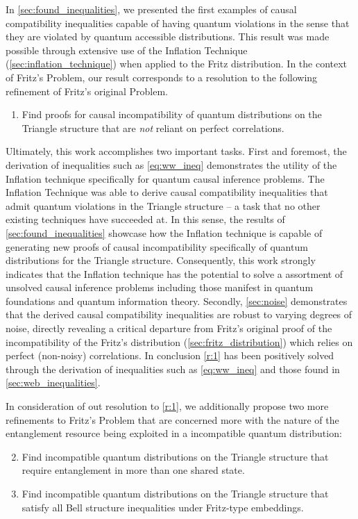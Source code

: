 \documentclass[aps, 10pt, english, twoside, pra, nofootinbib, tightenlines, longbibliography, superscriptaddress]{revtex4-1}
\begin{document}
    In \cref{sec:found_inequalities}, we presented the first examples of causal compatibility inequalities capable of having quantum violations in the sense that they are violated by quantum accessible distributions. This result was made possible through extensive use of the Inflation Technique (\cref{sec:inflation_technique}) when applied to the Fritz distribution. In the context of Fritz's Problem, our result corresponds to a resolution to the following refinement of Fritz's original Problem.
    \begin{enumerate}[label=\textbf{R.\arabic*}]
        \setcounter{enumi}{0}
        \item \label{r:1} Find proofs for causal incompatibility of quantum distributions on the Triangle structure that are \textit{not} reliant on perfect correlations.
    \end{enumerate}

    Ultimately, this work accomplishes two important tasks. First and foremost, the derivation of inequalities such as \cref{eq:ww_ineq} demonstrates the utility of the Inflation technique specifically for quantum causal inference problems. The Inflation Technique was able to derive causal compatibility inequalities that admit quantum violations in the Triangle structure -- a task that no other existing techniques have succeeded at. In this sense, the results of \cref{sec:found_inequalities} showcase how the Inflation technique is capable of generating new proofs of causal incompatibility specifically of quantum distributions for the Triangle structure. Consequently, this work strongly indicates that the Inflation technique has the potential to solve a assortment of unsolved causal inference problems including those manifest in quantum foundations and quantum information theory. Secondly, \cref{sec:noise} demonstrates that the derived causal compatibility inequalities are robust to varying degrees of noise, directly revealing a critical departure from Fritz's original proof of the incompatibility of the Fritz's distribution (\cref{sec:fritz_distribution}) which relies on perfect (non-noisy) correlations. In conclusion \ref{r:1} has been positively solved through the derivation of inequalities such as \cref{eq:ww_ineq} and those found in \cref{sec:web_inequalities}.

    In consideration of out resolution to \ref{r:1}, we additionally propose two more refinements to Fritz's Problem that are concerned more with the nature of the entanglement resource being exploited in a incompatible quantum distribution:
    \begin{enumerate}[label=\textbf{R.\arabic*}]
        \setcounter{enumi}{1}
        \item \label{r:2} Find incompatible quantum distributions on the Triangle structure that require entanglement in more than one shared state.
        \item \label{r:3} Find incompatible quantum distributions on the Triangle structure that satisfy all Bell structure inequalities under Fritz-type embeddings.
    \end{enumerate}
\end{document}
